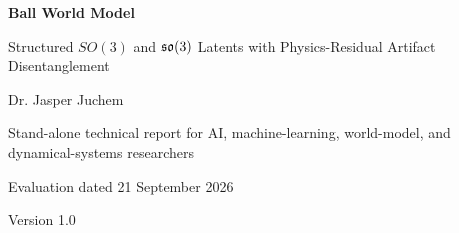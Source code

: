 \documentclass[11pt,a4paper]{article}
\begin{document}
\begin{titlepage}\centering\vspace*{22mm}
{\Huge\bfseries\color{reportblue} Ball World Model\par}\vspace{5mm}
{\LARGE Structured $SO(3)$ and $\mathfrak{so}(3)$ Latents with Physics-Residual Artifact Disentanglement\par}\vspace{15mm}
\vfill{\Large Dr. Jasper Juchem\par}\vspace{5mm}
{\large Stand-alone technical report for AI, machine-learning, world-model, and dynamical-systems researchers\par}\vspace{12mm}
{\large Evaluation dated 21 September 2026\par}{\large Version 1.0\par}
\end{titlepage}
\end{document}
